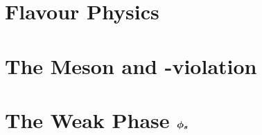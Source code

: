 \section{Flavour Physics}
\label{Flavour_Physics}


\section{The \Bs Meson and \CP-violation}
\label{Phenomenology}


\section{The Weak Phase $\boldsymbol{\phi_{s}}$}
\label{WeakPhase}


